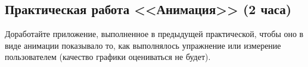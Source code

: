 \subsection{Практическая работа <<Анимация>> (2 часа)}

Доработайте приложение, выполненное в предыдущей практической, чтобы оно в виде анимации показывало то, как выполнялось упражнение или измерение пользователем (качество графики оцениваться не будет).

